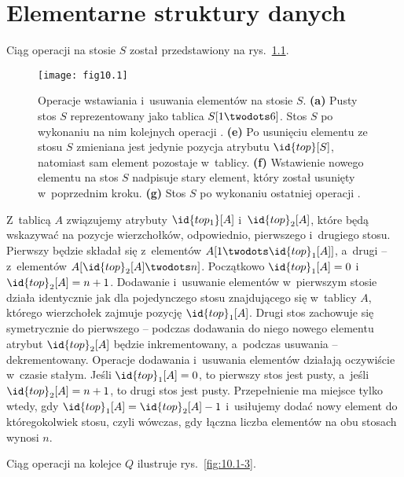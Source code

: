 \chapter{Elementarne struktury danych}


\exercise %
Ciąg operacji na stosie $S$ został przedstawiony na rys.~\ref{fig:10.1-1}.
\begin{figure}[ht]
    \begin{center}
		\texttt{[image: fig10.1]}
	\end{center}
	\caption{Operacje wstawiania i~usuwania elementów na stosie $S$. {\sffamily\bfseries(a)} Pusty stos $S$ reprezentowany jako tablica $S[1\twodots6]$. {\sffamily\bfseries{}} Stos $S$ po wykonaniu na nim kolejnych operacji . {\sffamily\bfseries(e)} Po usunięciu elementu ze stosu $S$ zmieniana jest jedynie pozycja atrybutu $\id{top}[S]$, natomiast sam element pozostaje w~tablicy. {\sffamily\bfseries(f)} Wstawienie nowego elementu na stos $S$ nadpisuje stary element, który został usunięty w~poprzednim kroku. {\sffamily\bfseries(g)} Stos $S$ po wykonaniu ostatniej operacji .} \label{fig:10.1-1}
\end{figure}

\exercise %
Z~tablicą $A$ związujemy atrybuty $\id{top_1}[A]$ i~$\id{top}_2[A]$, które będą wskazywać na pozycje wierzchołków, odpowiednio, pierwszego i~drugiego stosu. Pierwszy będzie składał się z~elementów $A[1\twodots\id{top}_1[A]]$, a~drugi -- z~elementów $A[\id{top}_2[A]\twodots n]$. Początkowo $\id{top}_1[A]=0$ i~$\id{top}_2[A]=n+1$. Dodawanie i~usuwanie elementów w~pierwszym stosie działa identycznie jak dla pojedynczego stosu znajdującego się w~tablicy $A$, którego wierzchołek zajmuje pozycję $\id{top}_1[A]$. Drugi stos zachowuje się symetrycznie do pierwszego -- podczas dodawania do niego nowego elementu atrybut $\id{top}_2[A]$ będzie inkrementowany, a~podczas usuwania -- dekrementowany. Operacje dodawania i~usuwania elementów działają oczywiście w~czasie stałym. Jeśli $\id{top}_1[A]=0$, to pierwszy stos jest pusty, a~jeśli $\id{top}_2[A]=n+1$, to drugi stos jest pusty. Przepełnienie ma miejsce tylko wtedy, gdy $\id{top}_1[A]=\id{top}_2[A]-1$ i~usiłujemy dodać nowy element do któregokolwiek stosu, czyli wówczas, gdy łączna liczba elementów na obu stosach wynosi $n$.

\exercise %
Ciąg operacji na kolejce $Q$ ilustruje rys.~\ref{fig:10.1-3}.

